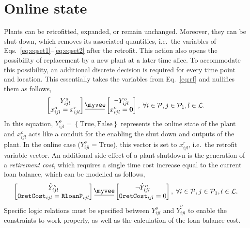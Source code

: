 \documentclass{amsart}
\newcommand{\myveebar}{\mathbin{\vcenter{\hbox{$ \underline{\mkern-2.4mu{\myvee}\mkern-2.4mu} $}}}}
\begin{document}
\section{Online state}
%
Plants can be retrofitted, expanded, or remain unchanged. Moreover, they can be
shut down, which removes its associated quantities, i.e.\ the variables of
Eqs.~\eqref{eq:eqset1}--\eqref{eq:eqset2} after the retrofit. 
This action also opens the possibility of replacement by a new plant at a
later time slice. To accommodate this possibility, an additional discrete
decision is required for every time point and location. This essentially takes
the variables from Eq.~\eqref{eq:rf} and nullifies them as follows,
%
\begin{equation}\label{eq:online_Stat}
    \begin{bmatrix}
        Y^o_{ijl} \\
        x^o_{ijl} = x^r_{ijl}
    \end{bmatrix}
    \myveebar
    \begin{bmatrix}
        \neg Y^o_{ijl} \\
        x^o_{ijl} = \bm{0}
    \end{bmatrix}
    , \; \forall i\in \mathcal{P}, j\in \mathcal{P}_1, l\in \mathcal{L}.
\end{equation}
%
In this equation, $Y^o_{ijl} = \left\{\text{True},\text{False}\right\}$
represents the online state of the plant and $x^o_{ijl}$ acts like a conduit for
the enabling the shut down and outputs of the plant. In the online case 
($Y^o_{ijl} = \text{True}$), this vector is set to $x^r_{ijl}$, i.e.\ the
retrofit variable vector.
%
An additional side-effect
of a plant shutdown is the generation of a \emph{retirement cost}, which
requires a single time cost increase equal to the current loan balance, which
can be modelled as follows,
%
\begin{equation}\label{eq:retcost}
    \begin{bmatrix}
        \hat{Y}^o_{ijl} \\
        \mathtt{OretCost}_{ijl} = \mathtt{RloanP}_{ijl}
    \end{bmatrix}
    \myveebar
    \begin{bmatrix}
        \neg \hat{Y}^o_{ijl} \\
        \mathtt{OretCost}_{ijl} = 0
    \end{bmatrix}
    , \; \forall i\in \mathcal{P}, j\in \mathcal{P}_1, l\in \mathcal{L}.
\end{equation}
%
Specific logic relations must be specified between $Y^{o}_{ijl}$ and
$\hat{Y}^o_{ijl}$ to enable the constraints to work properly, as well as
the calculation of the loan balance cost.
%
\end{document}
